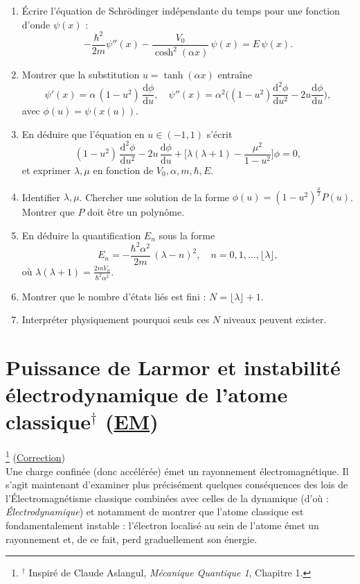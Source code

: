 \documentclass[a4paper,10pt]{report}
\begin{document}
\begin{enumerate}
	\item Écrire l'équation de Schrödinger indépendante du temps pour une fonction d'onde $\psi(x)$ :  
	\[
	-\frac{\hbar^2}{2m}\psi''(x) - \frac{V_0}{\cosh^2(\alpha x)} \,\psi(x) = E\,\psi(x).
	\]
	\item Montrer que la substitution $u = \tanh(\alpha x)$ entraîne 
	\[
	\psi'(x) = \alpha\,(1-u^2)\,\frac{\mathrm{d}\phi}{\mathrm{d}u}, 
	\quad
	\psi''(x) = \alpha^2\Big((1-u^2)\frac{\mathrm{d}^2\phi}{\mathrm{d}u^2} - 2u\frac{\mathrm{d}\phi}{\mathrm{d}u}\Big),
	\]
	avec $\phi(u)=\psi(x(u))$.
	\item En déduire que l'équation en $u\in(-1,1)$ s'écrit
	\[
	(1-u^2)\,\frac{\mathrm{d}^2\phi}{\mathrm{d}u^2} - 2u\,\frac{\mathrm{d}\phi}{\mathrm{d}u}
	+ \Big[\lambda(\lambda+1) - \frac{\mu^2}{1-u^2}\Big]\phi = 0,
	\]
	et exprimer $\lambda,\mu$ en fonction de $V_0,\alpha,m,\hbar,E$.
	\item Identifier $\lambda,\mu$. Chercher une solution de la forme $\phi(u) = (1-u^2)^{\frac \mu 2} P(u)$.
	Montrer que $P$ doit être un polynôme.
	\item En déduire la quantification $E_n$ sous la forme
	\[
	E_n = -\frac{\hbar^2\alpha^2}{2m}\,( \lambda - n)^2, 
	\quad n=0,1,\dots,\lfloor\lambda\rfloor,
	\]
	où $\lambda(\lambda+1)=\tfrac{2mV_0}{\hbar^2\alpha^2}$.
	\item Montrer que le nombre d'états liés est fini : $N = \lfloor\lambda\rfloor +1$.  
	\item Interpréter physiquement pourquoi seuls ces $N$ niveaux peuvent exister.  
\end{enumerate}

\newpage \section[Instabilité électrodynamique de l'atome classique]{Puissance de Larmor et instabilité électrodynamique de l'atome classique$^\dag$ (\hyperref[subsubsec:maxwell]{EM})\space \faStar\faStar}\footnote{$^\dag$ Inspiré de Claude Aslangul, \textit{Mécanique Quantique 1}, Chapitre 1.}\label{subsec:Instable}
(\hyperref[subsec:correctionInstable]{Correction})\\
Une charge confinée (donc accélérée) émet un rayonnement électromagnétique. Il s'agit maintenant d'examiner plus précisément quelques conséquences des lois de l'Électromagnétisme classique combinées avec celles de la dynamique (d'où : \emph{Électrodynamique}) et notamment de montrer que l'atome classique est fondamentalement instable : l'électron localisé au sein de l'atome émet un rayonnement et, de ce fait, perd graduellement son énergie.
\end{document}
